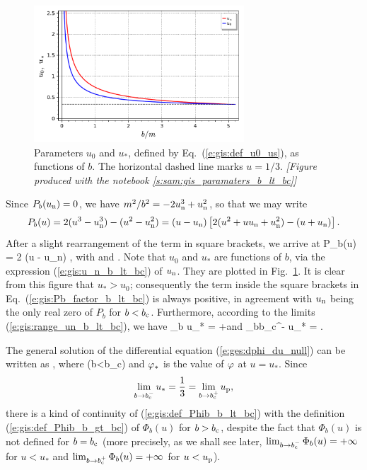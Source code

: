 \begin{figure}
\centerline{\includegraphics[width=0.7\textwidth]{gis_u0_us_b.pdf}}
\caption[]{\label{f:gis:u0_us_b} \footnotesize
Parameters $u_0$ and $u_*$, defined by Eq.~(\ref{e:gis:def_u0_us}), as functions
of $b$. The horizontal dashed line marks $u=1/3$.
\textsl{[Figure produced with the notebook \ref{s:sam:gis_paramaters_b_lt_bc}]}
}
\end{figure}


Since $P_b(u_{\rm n}) = 0$, we have $m^2/b^2 = - 2 u_{\rm n}^3 + u_{\rm n}^2$,
so that we may write
\[
    P_b(u) = 2 (u^3 - u_{\rm n}^3) - (u^2 - u_{\rm n}^2)
        = (u - u_{\rm n}) \left[ 2(u^2 + u u_{\rm n} + u_{\rm n}^2)
            - (u + u_{\rm n}) \right] .
\]
After a slight rearrangement of the term in square brackets, we arrive at
\be \label{e:gis:Pb_factor_b_lt_bc}
    P_b(u) = 2 (u - u_{\rm n}) \left[
        (u - u_0)^2 + (u_* - u_{\rm n})^2 - (u_0 - u_{\rm n})^2 \right] ,
\ee
with
\be \label{e:gis:def_u0_us}
    \qquad\mbox{and}\qquad
   .
\ee
Note that $u_0$ and $u_*$ are functions
of $b$, via the expression (\ref{e:gis:u_n_b_lt_bc}) of $u_{\rm n}$.
They are plotted in Fig.~\ref{f:gis:u0_us_b}. It is clear from this figure
that $u_* > u_0$; consequently the term inside the square brackets in
Eq.~(\ref{e:gis:Pb_factor_b_lt_bc}) is always positive, in agreement with
$u_{\rm n}$ being the only real
zero of $P_b$ for $b < b_{\rm c}$.
Furthermore, according to the limits (\ref{e:gis:range_un_b_lt_bc}), we have
\be \label{e:gis:lim_us}
    \lim_{b} u_* = +\infty \qquad\mbox{and}\qquad
    \lim_{b\to b_{\rm c}^-} u_* =  .
\ee

The general solution of the differential equation
(\ref{e:ges:dphi_du_null}) can be written as
\be \label{e:gis:ph_phs_Phib}
   ,
\ee
where
\be \label{e:gis:def_Phib_b_lt_bc}
     \quad (b<b_{\rm c})
\ee
and $\varphi_*$ is the value of $\varphi$ at $u=u_*$. Since
\[
    \lim_{b\to b_{\rm c}^-} u_* = \frac{1}{3} = \lim_{b\to b_{\rm c}^+} u_{\rm p},
\]
there is a kind of continuity of (\ref{e:gis:def_Phib_b_lt_bc})
with the definition (\ref{e:gis:def_Phib_b_gt_bc}) of $\Phi_b(u)$ for
$b>b_{\rm c}$, despite the fact that $\Phi_b(u)$ is not defined
for $b=b_{\rm c}$ (more precisely, as we shall see later,
$\lim_{b\to b_{\rm c}^-} \Phi_b(u) = + \infty$ for $u<u_*$ and
$\lim_{b\to b_{\rm c}^+} \Phi_b(u) = + \infty$ for $u<u_{\rm p}$).

